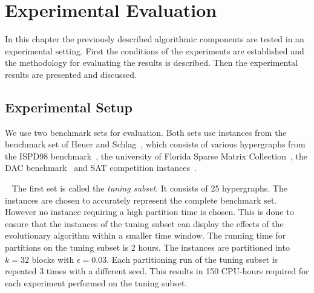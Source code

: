 \documentclass[a4paper,12pt,titlepage, BCOR7mm,headsepline]{scrbook}
\numberwithin{equation}{section}
\begin{document}
\chapter{Experimental Evaluation}
\label{chapter:experimentalevaluation}
In this chapter the previously described algorithmic components are tested in an experimental setting. First the conditions of the experiments are established and the methodology for evaluating the results is described. Then the experimental results are presented and discussed. 



\section{Experimental Setup}
\label{sec:experimental_setup}
We use two benchmark sets for evaluation. Both sets use instances from the benchmark set of Heuer and Schlag~\cite{heuer2017improving}, which consists of various hypergraphs from the ISPD98 benchmark~\cite{alpert1998ispd98}, the university of Florida Sparse Matrix Collection~\cite{davis2011university}, the DAC benchmark~\cite{viswanathan2012dac} and SAT competition instances~\cite{belov2014proceedings}. 



\newline ~\newline
The first set is called the \emph{tuning subset}. It consists of 25 hypergraphs. The instances are chosen to accurately represent the complete benchmark set. However no instance requiring a high partition time is chosen. This is done to ensure that the instances of the tuning subset can display the effects of the evolutionary algorithm within a smaller time window. The running time for partitions on the tuning subset is 2 hours. The instances are partitioned into $k = 32$ blocks with $\epsilon = 0.03$. Each partitioning run of the tuning subset is repeated 3 times with a different seed. This results in 150 CPU-hours required for each experiment performed on the tuning subset.
\newline
\end{document}
